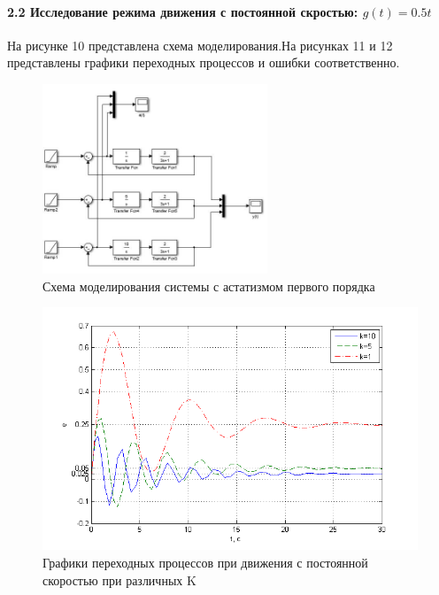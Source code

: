 \documentclass[a4paper, 12pt]{article}
\begin{document}
\paragraph{2.2 Исследование режима движения с постоянной скростью: $g(t) = 0.5t$}\hfill\par
На рисунке 10 представлена схема моделирования.На рисунках 11 и 12 представлены графики переходных процессов и ошибки соответственно.
\begin{figure}[H]
	\centering
	\includegraphics[width = 0.6\textwidth]{sxema4}
	\caption{Схема моделирования системы с астатизмом первого порядка}
\end{figure}
\begin{figure}[h]
	\centering
	\includegraphics[width = 1\textwidth]{hinh8}
	\caption{Графики переходных процессов при движения с постоянной скоростью при различных K}
\end{figure}
\end{document}
